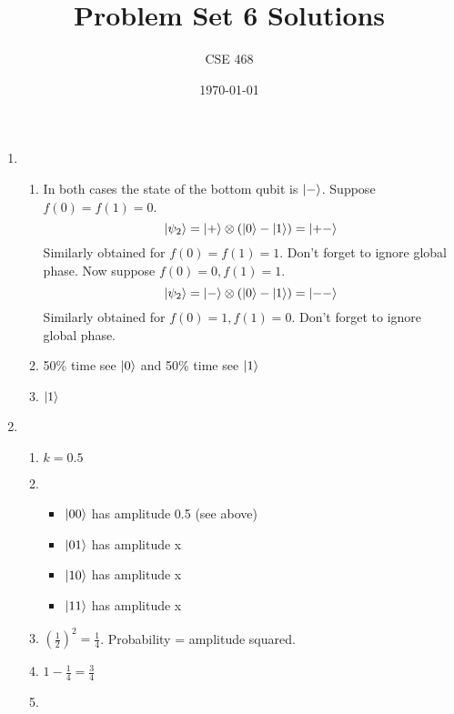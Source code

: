 \documentclass[12pt]{article}
\title{Problem Set 6 Solutions}
\author{CSE 468}
\date{\today}
\begin{document}
\maketitle

\begin{enumerate}[font=\bfseries]
    \item \begin{enumerate}
        \item In both cases the state of the bottom qubit is $\ket{-}$. Suppose $f(0) = f(1) = 0$.
        \[\ket{\psi_2} = \ket{+} \otimes (\ket{0} - \ket{1}) = \ket{+-}\]
        Similarly obtained for $f(0) = f(1) = 1$. Don't forget to ignore global phase.
        Now suppose $f(0) = 0, f(1) = 1$.
        \[\ket{\psi_2} = \ket{-} \otimes (\ket{0} - \ket{1}) = \ket{--}\]
        Similarly obtained for $f(0) = 1, f(1) = 0$. Don't forget to ignore global phase.
        \item 50\% time see $\ket{0}$ and 50\% time see $\ket{1}$
        \item $\ket{1}$
    \end{enumerate}
    \item \begin{enumerate}
        \item $k = 0.5$
    \item \begin{itemize}
        \item $\ket{00}$ has amplitude 0.5 (see above)
        \item $\ket{01}$ has amplitude x
        \item $\ket{10}$ has amplitude x
        \item $\ket{11}$ has amplitude x
    \end{itemize}
    \item $(\frac{1}{2})^2 = \frac{1}{4}$. Probability = amplitude squared. 
    \item $1 - \frac{1}{4} = \frac{3}{4}$
    \item 
    \end{enumerate}
\end{enumerate}
\end{document}
